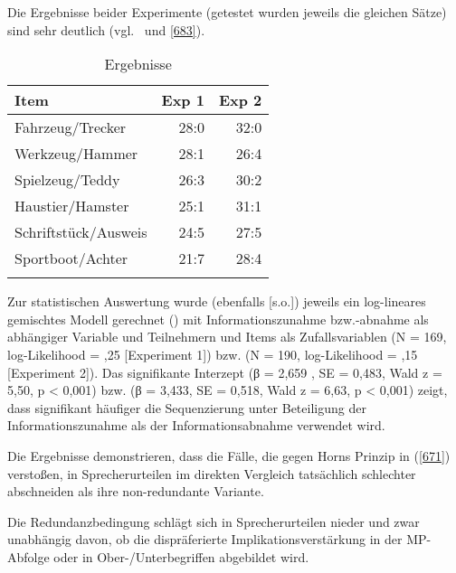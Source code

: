 Die Ergebnisse beider Experimente (getestet wurden jeweils die gleichen Sätze) sind sehr deutlich (vgl.\  und \ref{683}).

\begin{table}
	\caption{\label{tab:682}Ergebnisse}
	\begin{tabular}{lrr}
	\lsptoprule
	{Item} & Exp 1 & Exp 2 \\
	\midrule
	Fahrzeug/Trecker & 28:0 & 32:0\\
	Werkzeug/Hammer & 28:1 & 26:4\\
	Spielzeug/Teddy & 26:3 & 30:2\\
	Haustier/Hamster & 25:1 & 31:1\\
	Schriftstück/Ausweis & 24:5 & 27:5\\
	Sportboot/Achter & 21:7 & 28:4\\
	\lspbottomrule
    \end{tabular}
\end{table}\largerpage[2]
Zur statistischen Auswertung wurde (ebenfalls [s.o.]) jeweils ein log-lineares gemischtes Modell gerechnet (\citealt{Baayen2008}) mit Informationszunahme bzw.\linebreak -abnahme als abhängiger Variable und Teilnehmern und Items als Zufallsvariablen (N = 169, log-Like\-li\-hood = ,25 [Experiment 1]) bzw. (N = 190, log-Like\-li\-hood = ,15 [Experiment 2]). Das signifikante Interzept (β =  2,659 , SE = 0,483, Wald z = 5,50, p < 0,001) bzw. (β =  3,433, SE = 0,518, Wald z = 6,63, p < 0,001) zeigt, dass signifikant häufiger die Sequenzierung unter Beteiligung der Informationszunahme als der Informationsabnahme verwendet wird.

Die Ergebnisse demonstrieren, dass die Fälle, die gegen Horns Prinzip in (\ref{671}) verstoßen, in Sprecherurteilen im direkten Vergleich tatsächlich schlechter abschneiden als ihre non-redundante Variante.

\pagebreak Die Redundanzbedingung  schlägt sich in Sprecherurteilen nieder und zwar unabhängig davon, ob die dispräferierte Implikationsverstärkung in der MP-Ab\-fol\-ge oder in Ober-/Unterbegriffen abgebildet wird.

